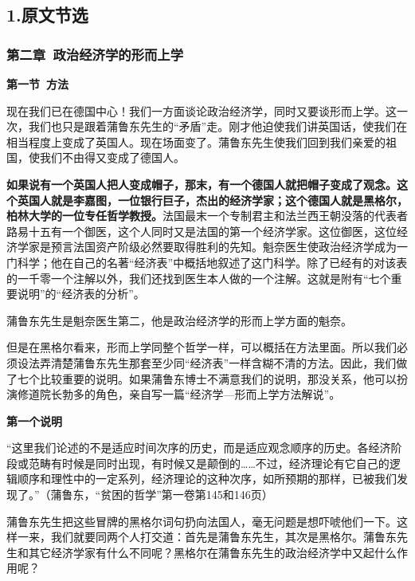 \documentclass[a4paper,twoside,12pt]{ctexart}
\begin{document}
\subsection{1.原文节选}
\subsubsection{第二章~政治经济学的形而上学}
\begin{center}
    \textbf{第一节~方法}
\end{center}

现在我们已在德国中心！我们一方面谈论政治经济学，同时又要谈形而上学。这一次，我们也只是跟着蒲鲁东先生的“矛盾”走。刚才他迫使我们讲英国话，使我们在相当程度上变成了英国人。现在场面变了。蒲鲁东先生使我们回到我们亲爱的祖国，使我们不由得又变成了德国人。

\textbf{如果说有一个英国人把人变成帽子，那末，有一个德国人就把帽子变成了观念。这个英国人就是李嘉图，一位银行巨子，杰出的经济学家；这个德国人就是黑格尔，柏林大学的一位专任哲学教授。}法国最末一个专制君主和法兰西王朝没落的代表者路易十五有一个御医，这个人同时又是法国的第一个经济学家。这位御医，这位经济学家是预言法国资产阶级必然要取得胜利的先知。魁奈医生使政治经济学成为一门科学；他在自己的名著“经济表”中概括地叙述了这门科学。除了已经有的对该表的一千零一个注解以外，我们还找到医生本人做的一个注解。这就是附有“七个重要说明”的“经济表的分析”。

蒲鲁东先生是魁奈医生第二，他是政治经济学的形而上学方面的魁奈。

但是在黑格尔看来，形而上学同整个哲学一样，可以概括在方法里面。所以我们必须设法弄清楚蒲鲁东先生那套至少同“经济表”一样含糊不清的方法。因此，我们做了七个比较重要的说明。如果蒲鲁东博士不满意我们的说明，那没关系，他可以扮演修道院长勃多的角色，亲自写一篇“经济学—形而上学方法解说”。

\begin{center}
\textbf{第一个说明}    
\end{center}

\begin{fangsong}
    “这里我们论述的不是适应时间次序的历史，而是适应观念顺序的历史。各经济阶段或范畴有时候是同时出现，有时候又是颠倒的……不过，经济理论有它自己的逻辑顺序和理性中的一定系列，经济理论的这种次序，如所预期的那样，已被我们发现了。”（蒲鲁东，“贫困的哲学”第一卷第145和146页）
\end{fangsong}

蒲鲁东先生把这些冒牌的黑格尔词句扔向法国人，毫无问题是想吓唬他们一下。这样一来，我们就要同两个人打交道：首先是蒲鲁东先生，其次是黑格尔。蒲鲁东先生和其它经济学家有什么不同呢？黑格尔在蒲鲁东先生的政治经济学中又起什么作用呢？
\end{document}
